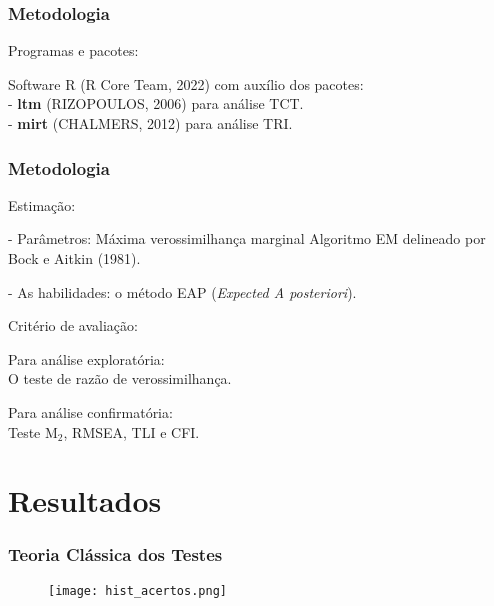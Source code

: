 \documentclass{beamer}
\begin{document}
	\begin{frame}
		
		\frametitle{Metodologia}
		\begin{center}	Programas e pacotes: \end{center}
		Software R (R Core Team, 2022) com auxílio dos pacotes: \\ \pause
		- \textbf{ltm} (RIZOPOULOS, 2006) para análise TCT.\\ \pause 
		- \textbf{mirt} (CHALMERS, 2012) para análise TRI.\\
		

	\end{frame}
	
	\begin{frame}
		
		\frametitle{Metodologia}
		\begin{center}	Estimação: \end{center}
		
		- Parâmetros: Máxima verossimilhança marginal Algoritmo EM delineado por Bock e Aitkin (1981).\\ \newline
		
		- As habilidades: o método EAP (\textit{Expected A posteriori}). 
		
	\end{frame}
	
	\begin{frame}
		
		
		\begin{center}	Critério de avaliação:	\end{center}
		
		Para análise exploratória: \\
		
		O teste de razão de verossimilhança. \newline
		
		Para análise confirmatória:\\
		
		Teste M$_2$, RMSEA, TLI e CFI. \newline
		
	\end{frame}
	
	
	\section{Resultados}
	
	\begin{frame}
		
	\frametitle{Teoria Clássica dos Testes}
		
	\begin{figure}[H]
		\texttt{[image: hist\_acertos.png]}
	\end{figure}
		
	\end{frame}
	
\end{document}
